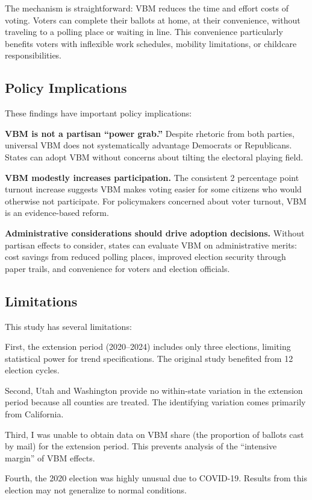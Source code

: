 \documentclass[12pt]{article}
\begin{document}
The mechanism is straightforward: VBM reduces the time and effort costs of voting. Voters can complete their ballots at home, at their convenience, without traveling to a polling place or waiting in line. This convenience particularly benefits voters with inflexible work schedules, mobility limitations, or childcare responsibilities.

\subsection{Policy Implications}

These findings have important policy implications:

\textbf{VBM is not a partisan ``power grab.''} Despite rhetoric from both parties, universal VBM does not systematically advantage Democrats or Republicans. States can adopt VBM without concerns about tilting the electoral playing field.

\textbf{VBM modestly increases participation.} The consistent 2 percentage point turnout increase suggests VBM makes voting easier for some citizens who would otherwise not participate. For policymakers concerned about voter turnout, VBM is an evidence-based reform.

\textbf{Administrative considerations should drive adoption decisions.} Without partisan effects to consider, states can evaluate VBM on administrative merits: cost savings from reduced polling places, improved election security through paper trails, and convenience for voters and election officials.

\subsection{Limitations}

This study has several limitations:

First, the extension period (2020--2024) includes only three elections, limiting statistical power for trend specifications. The original study benefited from 12 election cycles.

Second, Utah and Washington provide no within-state variation in the extension period because all counties are treated. The identifying variation comes primarily from California.

Third, I was unable to obtain data on VBM share (the proportion of ballots cast by mail) for the extension period. This prevents analysis of the ``intensive margin'' of VBM effects.

Fourth, the 2020 election was highly unusual due to COVID-19. Results from this election may not generalize to normal conditions.
\end{document}
